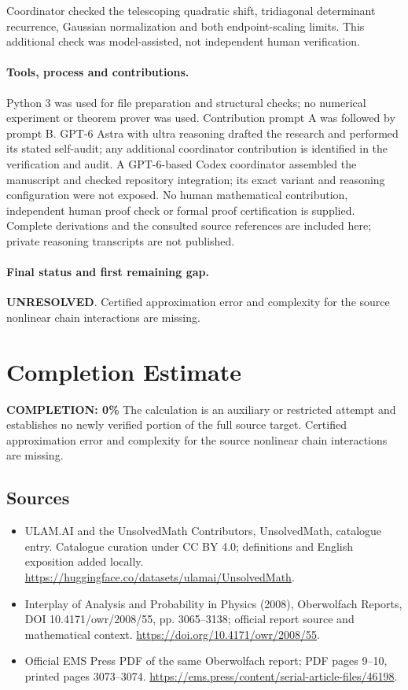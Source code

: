 \documentclass[11pt]{article}
\begin{document}
Coordinator checked the telescoping quadratic shift, tridiagonal determinant recurrence, Gaussian normalization and both endpoint-scaling limits. This additional check was model-assisted, not independent human verification.

\paragraph{Tools, process and contributions.}
Python 3 was used for file preparation and structural checks; no numerical experiment or theorem prover was used. Contribution prompt A was followed by prompt B. GPT-6 Astra with ultra reasoning drafted the research and performed its stated self-audit; any additional coordinator contribution is identified in the verification and audit. A GPT-6-based Codex coordinator assembled the manuscript and checked repository integration; its exact variant and reasoning configuration were not exposed. No human mathematical contribution, independent human proof check or formal proof certification is supplied. Complete derivations and the consulted source references are included here; private reasoning transcripts are not published.

\paragraph{Final status and first remaining gap.}
\textbf{UNRESOLVED}. Certified approximation error and complexity for the source nonlinear chain interactions are missing.

\section{Completion Estimate}
\noindent\textbf{COMPLETION: 0\%}
The calculation is an auxiliary or restricted attempt and establishes no newly verified portion of the full source target. Certified approximation error and complexity for the source nonlinear chain interactions are missing.

\subsection{Sources}
\begin{itemize}
\item[\hypertarget{source:statement:1}{S1}] ULAM.AI and the UnsolvedMath Contributors, UnsolvedMath, catalogue entry. Catalogue curation under CC BY 4.0; definitions and English exposition added locally.
\url{https://huggingface.co/datasets/ulamai/UnsolvedMath}.
\item[\hypertarget{source:statement:2}{S2}] Interplay of Analysis and Probability in Physics (2008), Oberwolfach Reports, DOI 10.4171/owr/2008/55, pp. 3065--3138; official report source and mathematical context.
\url{https://doi.org/10.4171/owr/2008/55}.
\item[\hypertarget{source:statement:3}{S3}] Official EMS Press PDF of the same Oberwolfach report; PDF pages 9--10, printed pages 3073--3074.
\url{https://ems.press/content/serial-article-files/46198}.
\end{itemize}
\label{end:statement}
\end{document}
